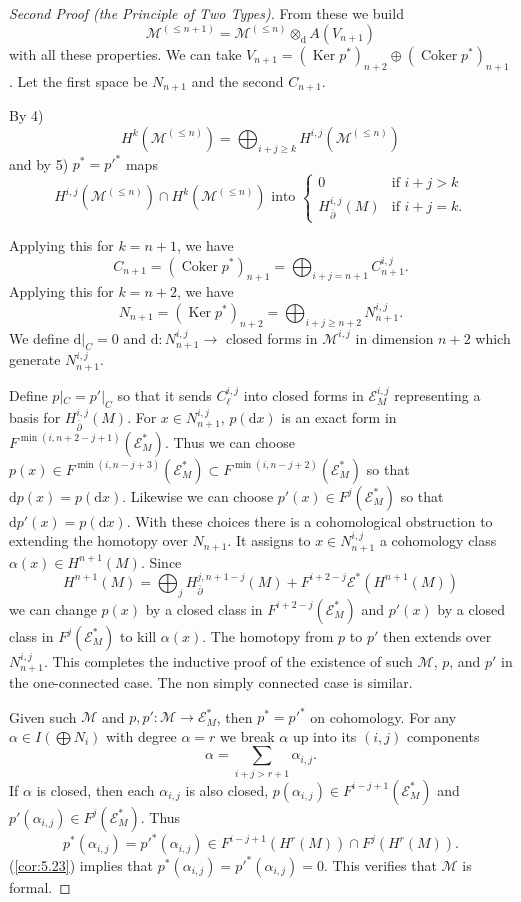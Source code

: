 \documentclass[11pt]{amsart}
\theoremstyle{plain}
\theoremstyle{definition}
\DeclareMathOperator{\Ker}{Ker}
\DeclareMathOperator{\Coker}{Coker}
\newcommand{\sE}{\mathscr{E}}
\newcommand{\cM}{\mathcal{M}}
\newcommand{\dd}{\mathrm{d}}
\begin{document}
\begin{proof}[Second Proof (the Principle of Two Types)]
From these we build
\[
\cM^{(\le n+1)} = \cM^{(\le n)} \otimes_{\dd} A(V_{n+1})
\]
with all these properties. We can take $V_{n+1} = (\Ker p^{*})_{n+2} \oplus (\Coker p^{*})_{n+1}$. Let the first space be $N_{n+1}$ and the second $C_{n+1}$.

By 4)
\[
H^{k}(\cM^{(\le n)}) = \bigoplus_{i+j \ge k} H^{i,j}(\cM^{(\le n)})
\]
and by 5) $p^{*} = p'^{*}$ maps
\[
H^{i,j}(\cM^{(\le n)}) \cap H^{k}(\cM^{(\le n)}) \text{ into } \begin{cases} 0 & \text{if } i+j > k \\ H^{i,j}_{\bar{\partial}}(M) & \text{if } i+j = k. \end{cases}
\]

Applying this for $k = n+1$, we have
\[
C_{n+1} = (\Coker p^{*})_{n+1} = \bigoplus_{i+j = n+1} C^{i,j}_{n+1}.
\]
Applying this for $k = n+2$, we have
\[
N_{n+1} = (\Ker p^{*})_{n+2} = \bigoplus_{i+j \ge n+2} N^{i,j}_{n+1}.
\]
We define $\dd|_{C} = 0$ and $\dd \colon N^{i,j}_{n+1} \to$ closed forms in $\cM^{i,j}$ in dimension $n+2$ which generate $N^{i,j}_{n+1}$.

Define $p|_{C} = p'|_{C}$ so that it sends $C^{i,j}_{\ell}$ into closed forms in $\sE^{i,j}_{M}$ representing a basis for $H^{i,j}_{\bar{\partial}}(M)$. For $x \in N^{i,j}_{n+1}$, $p(\dd x)$ is an exact form in $F^{\min(i, n+2-j+1)}(\sE^{*}_{M})$. Thus we can choose $p(x) \in F^{\min(i, n-j+3)}(\sE^{*}_{M}) \subset F^{\min(i, n-j+2)}(\sE^{*}_{M})$ so that $\dd p(x) = p(\dd x)$. Likewise we can choose $p'(x) \in F^{j}(\sE^{*}_{M})$ so that $\dd p'(x) = p(\dd x)$. With these choices there is a cohomological obstruction to extending the homotopy over $N_{n+1}$. It assigns to $x \in N^{i,j}_{n+1}$ a cohomology class $\alpha(x) \in H^{n+1}(M)$. Since
\[
H^{n+1}(M) = \bigoplus_{j} H^{j, n+1-j}_{\bar{\partial}}(M) + F^{i+2-j}\sE^{*}(H^{n+1}(M))
\]
we can change $p(x)$ by a closed class in $F^{i+2-j}(\sE^{*}_{M})$ and $p'(x)$ by a closed class in $F^{j}(\sE^{*}_{M})$ to kill $\alpha(x)$. The homotopy from $p$ to $p'$ then extends over $N^{i,j}_{n+1}$. This completes the inductive proof of the existence of such $\cM$, $p$, and $p'$ in the one-connected case. The non simply connected case is similar.

Given such $\cM$ and $p, p' \colon \cM \to \sE^{*}_{M}$, then $p^{*} = p'^{*}$ on cohomology. For any $\alpha \in I(\bigoplus N_{i})$ with degree $\alpha = r$ we break $\alpha$ up into its $(i,j)$ components
\[
\alpha = \sum_{i+j > r+1} \alpha_{i,j}.
\]
If $\alpha$ is closed, then each $\alpha_{i,j}$ is also closed, $p(\alpha_{i,j}) \in F^{i-j+1}(\sE^{*}_{M})$ and $p'(\alpha_{i,j}) \in F^{j}(\sE^{*}_{M})$. Thus
\[
p^{*}(\alpha_{i,j}) = p'^{*}(\alpha_{i,j}) \in F^{i-j+1}(H^{r}(M)) \cap F^{j}(H^{r}(M)).
\]
(\ref{cor:5.23}) implies that $p^{*}(\alpha_{i,j}) = p'^{*}(\alpha_{i,j}) = 0$. This verifies that $\cM$ is formal.
\end{proof}
\end{document}
